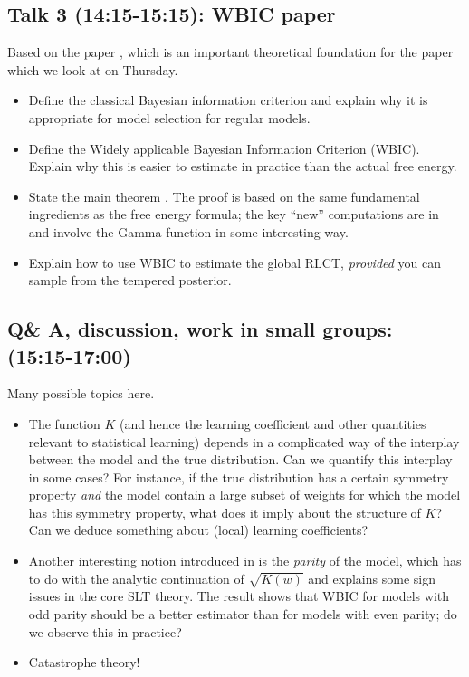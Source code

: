 \documentclass[a4paper,11pt]{amsart}
\begin{document}
\subsection*{Talk 3 (14:15-15:15): WBIC paper}

Based on the paper \cite{WBIC}, which is an important theoretical foundation for the paper \cite{lambdahat} which we look at on Thursday.

\begin{itemize}
\item Define the classical Bayesian information criterion and explain why it is appropriate for model selection for regular models.  
\item Define the Widely applicable Bayesian Information Criterion (WBIC). Explain why this is easier to estimate in practice than the actual free energy.
\item State the main theorem \cite[Theorem 4]{WBIC}. The proof is based on the same fundamental ingredients as the free energy formula; the key ``new'' computations are in \cite[\S 5.7]{WBIC} and involve the Gamma function in some interesting way.
\item Explain how to use WBIC to estimate the global RLCT, \emph{provided} you can sample from the tempered posterior.  
\end{itemize}

\subsection*{Q\& A, discussion, work in small groups: (15:15-17:00)}
Many possible topics here.
\begin{itemize}
\item The function $K$ (and hence the learning coefficient and other quantities relevant to statistical learning) depends in a complicated way of the interplay between the model and the true distribution. Can we quantify this interplay in some cases? For instance, if the true distribution has a certain symmetry property \emph{and} the model contain a large subset of weights for which the model has this symmetry property, what does it imply about the structure of $K$? Can we deduce something about (local) learning coefficients?
\item Another interesting notion introduced in \cite[\S 3]{WBIC} is the \emph{parity} of the model, which has to do with the analytic continuation of $\sqrt{K(w)}$ and explains some sign issues in the core SLT theory. The result \cite[Corollary 1]{WBIC} shows that WBIC for models with odd parity should be a better estimator than for models with even parity; do we observe this in practice?
\item Catastrophe theory!  
\end{itemize}
\end{document}
